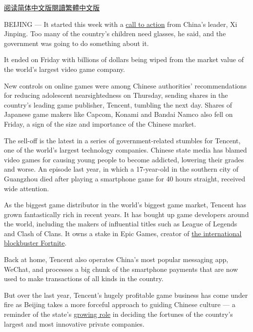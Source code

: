 \href{https://cn.nytimes.com/china/20180903/china-videogames-myopia-tencent/}{阅读简体中文版}\href{https://cn.nytimes.com/china/20180903/china-videogames-myopia-tencent/zh-hant/}{閱讀繁體中文版}

BEIJING --- It started this week with a
\href{http://www.xinhuanet.com/politics/2018-08/28/c_1123341203.htm}{call
to action} from China's leader, Xi Jinping. Too many of the country's
children need glasses, he said, and the government was going to do
something about it.

It ended on Friday with billions of dollars being wiped from the market
value of the world's largest video game company.

New controls on online games were among Chinese authorities'
recommendations for reducing adolescent nearsightedness on Thursday,
sending shares in the country's leading game publisher, Tencent,
tumbling the next day. Shares of Japanese game makers like Capcom,
Konami and Bandai Namco also fell on Friday, a sign of the size and
importance of the Chinese market.

The sell-off is the latest in a series of government-related stumbles
for Tencent, one of the world's largest technology companies. Chinese
state media has blamed video games for causing young people to become
addicted, lowering their grades and worse. An episode last year, in
which a 17-year-old in the southern city of Guangzhou died after playing
a smartphone game for 40 hours straight, received wide attention.

As the biggest game distributor in the world's biggest game market,
Tencent has grown fantastically rich in recent years. It has bought up
game developers around the world, including the makers of influential
titles such as League of Legends and Clash of Clans. It owns a stake in
Epic Games, creator of
\href{https://www.nytimes.com/2018/05/02/style/fortnite.html}{the
international blockbuster Fortnite}.

Back at home, Tencent also operates China's most popular messaging app,
WeChat, and processes a big chunk of the smartphone payments that are
now used to make transactions of all kinds in the country.

But over the last year, Tencent's hugely profitable game business has
come under fire as Beijing takes a more forceful approach to guiding
Chinese culture --- a reminder of the state's
\href{https://www.nytimes.com/2018/05/02/technology/china-xi-jinping-technology-innovation.html}{growing
role} in deciding the fortunes of the country's largest and most
innovative private companies.

